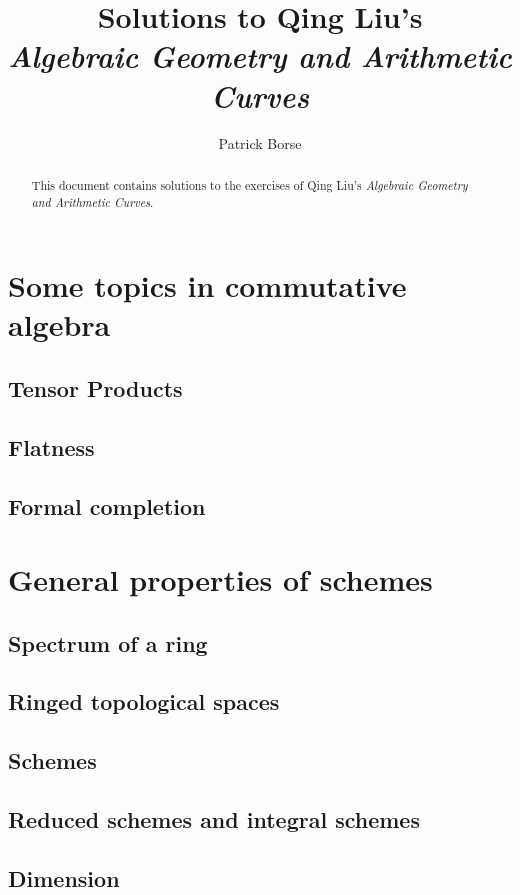 \documentclass[oneside]{amsbook}
\title{Solutions to Qing Liu's\\ \emph{Algebraic Geometry and Arithmetic Curves}}
\author{Patrick Borse}
\begin{document}
\begin{abstract}
This document contains solutions to the exercises of Qing Liu's \emph{Algebraic Geometry and Arithmetic Curves}.
\end{abstract}

\maketitle

\tableofcontents

\chapter{Some topics in commutative algebra}
\section{Tensor Products}

\section{Flatness}

\section{Formal completion}


\chapter{General properties of schemes}
\section{Spectrum of a ring}

\section{Ringed topological spaces}

\section{Schemes}

\section{Reduced schemes and integral schemes}

\section{Dimension}

\end{document}
